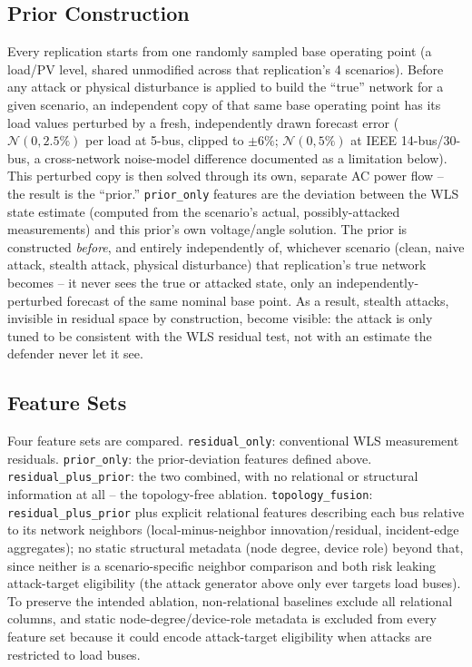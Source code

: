 \documentclass[conference]{IEEEtran}
\begin{document}
\subsection{Prior Construction}
Every replication starts from one randomly sampled base operating point (a load/PV level, shared unmodified across that replication's 4 scenarios). Before any attack or physical disturbance is applied to build the ``true'' network for a given scenario, an independent copy of that same base operating point has its load values perturbed by a fresh, independently drawn forecast error ($\mathcal{N}(0, 2.5\%)$ per load at 5-bus, clipped to $\pm6\%$; $\mathcal{N}(0, 5\%)$ at IEEE 14-bus/30-bus, a cross-network noise-model difference documented as a limitation below). This perturbed copy is then solved through its own, separate AC power flow -- the result is the ``prior.'' \texttt{prior\_only} features are the deviation between the WLS state estimate (computed from the scenario's actual, possibly-attacked measurements) and this prior's own voltage/angle solution. The prior is constructed \emph{before}, and entirely independently of, whichever scenario (clean, naive attack, stealth attack, physical disturbance) that replication's true network becomes -- it never sees the true or attacked state, only an independently-perturbed forecast of the same nominal base point. As a result, stealth attacks, invisible in residual space by construction, become visible: the attack is only tuned to be consistent with the WLS residual test, not with an estimate the defender never let it see.

\subsection{Feature Sets}
Four feature sets are compared. \texttt{residual\_only}: conventional WLS measurement residuals. \texttt{prior\_only}: the prior-deviation features defined above. \texttt{residual\_plus\_prior}: the two combined, with no relational or structural information at all -- the topology-free ablation. \texttt{topology\_fusion}: \texttt{residual\_plus\_prior} plus explicit relational features describing each bus relative to its network neighbors (local-minus-neighbor innovation/residual, incident-edge aggregates); no static structural metadata (node degree, device role) beyond that, since neither is a scenario-specific neighbor comparison and both risk leaking attack-target eligibility (the attack generator above only ever targets load buses). To preserve the intended ablation, non-relational baselines exclude all relational columns, and static node-degree/device-role metadata is excluded from every feature set because it could encode attack-target eligibility when attacks are restricted to load buses.
\end{document}
